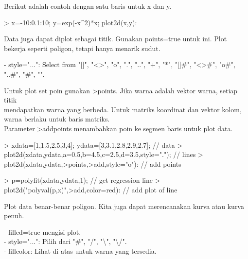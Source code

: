 \documentclass{report}
\begin{document}
\begin{eulernotebook}
\begin{eulercomment}
\begin{eulercomment}
\begin{eulercomment}
\begin{eulercomment}
\begin{eulercomment}
Berikut adalah contoh dengan satu baris untuk x dan y.
\end{eulercomment}
\begin{eulerprompt}
> x=-10:0.1:10; y=exp(-x^2)*x; plot2d(x,y):
\end{eulerprompt}
\begin{eulercomment}
Data juga dapat diplot sebagai titik. Gunakan points=true untuk ini.
Plot bekerja seperti poligon, tetapi hanya menarik sudut.

- style="...": Select from "[]", "\textless{}\textgreater{}", "o", ".", "..", "+", "*",
"[]#", "\textless{}\textgreater{}#", "o#", "..#", "#", "\textbar{}".

Untuk plot set poin gunakan \textgreater{}points. Jika warna adalah vektor warna,
setiap titik\\
mendapatkan warna yang berbeda. Untuk matriks koordinat dan vektor
kolom, warna berlaku untuk baris matriks.\\
Parameter \textgreater{}addpoints menambahkan poin ke segmen baris untuk plot data.
\end{eulercomment}
\begin{eulerprompt}
> xdata=[1,1.5,2.5,3,4]; ydata=[3,3.1,2.8,2.9,2.7]; // data
> plot2d(xdata,ydata,a=0.5,b=4.5,c=2.5,d=3.5,style="."); // lines
> plot2d(xdata,ydata,>points,>add,style="o"): // add points
\end{eulerprompt}
\begin{eulerprompt}
> p=polyfit(xdata,ydata,1); // get regression line
> plot2d("polyval(p,x)",>add,color=red): // add plot of line
\end{eulerprompt}
\begin{eulercomment}
Plot data benar-benar poligon. Kita juga dapat merencanakan kurva atau
kurva penuh.

- filled=true mengisi plot.\\
- style="...": Pilih dari "#", "/", "\textbackslash{}", "\textbackslash{}/".\\
- fillcolor: Lihat di atas untuk warna yang tersedia.


\end{eulercomment}
\end{eulercomment}
\end{eulercomment}
\end{eulercomment}
\end{eulercomment}
\end{eulernotebook}
\end{document}
